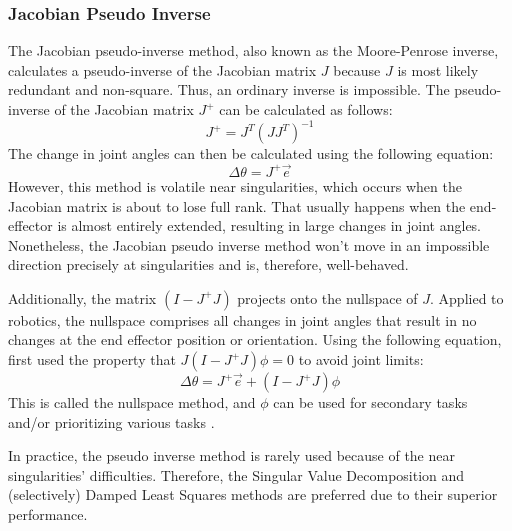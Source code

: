 \documentclass[conference]{IEEEtran}
\begin{document}
\subsubsection{Jacobian Pseudo Inverse}
The Jacobian pseudo-inverse method, also known as the Moore-Penrose inverse, calculates a pseudo-inverse of the Jacobian matrix $J$ because $J$ is most likely redundant \cite{springer_redundant} and non-square. Thus, an ordinary inverse is impossible. The pseudo-inverse of the Jacobian matrix $J^+$ can be calculated as follows:
\begin{equation}
J^+ = J^T(JJ^T)^{-1}
\end{equation}
The change in joint angles can then be calculated using the following equation:
\begin{equation}
\Delta\theta = J^+\vec{e}
\end{equation}
However, this method is volatile near singularities, which occurs when the Jacobian matrix is about to lose full rank. That usually happens when the end-effector is almost entirely extended, resulting in large changes in joint angles. Nonetheless, the Jacobian pseudo inverse method won't move in an impossible direction precisely at singularities and is, therefore, well-behaved. 

Additionally, the matrix $(I - J^+J)$ projects onto the nullspace of $J$. Applied to robotics, the nullspace comprises all changes in joint angles that result in no changes at the end effector position or orientation. Using the following equation, \cite{liegois_automatic_1977} first used the property that $J(I - J^+J)\phi = 0$ to avoid joint limits:
\begin{equation}
\Delta\theta = J^+\vec{e} + (I - J^+J)\phi
\end{equation}
This is called the nullspace method, and $\phi$ can be used for secondary tasks and/or prioritizing various tasks \cite{baerlocher_task-priority_1998} \cite{chiaverini_singularity-robust_1997}. 

In practice, the pseudo inverse method is rarely used because of the near singularities' difficulties. Therefore, the Singular Value Decomposition and (selectively) Damped Least Squares methods are preferred due to their superior performance\cite{buss_selectively_2005}.
\end{document}

